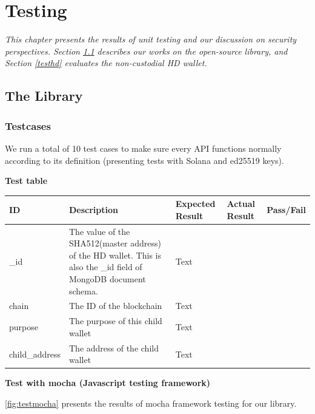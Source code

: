 \setlength{\abovedisplayskip}{0pt}
\setlength{\belowdisplayskip}{0pt}
\setlength{\abovedisplayshortskip}{0pt}
\setlength{\belowdisplayshortskip}{0pt}

\chapter{Testing}
\label{chap:testing}

\textit{This chapter presents the results of unit testing and our discussion on security perspectives. Section \ref{testlib} describes our works on the open-source library, and Section \ref{testhd} evaluates the non-custodial HD wallet.}

\minitoc

\section{The Library}
\label{testlib}
\subsection{Testcases}

We run a total of 10 test cases to make sure every API functions normally according to its definition (presenting tests with Solana and ed25519 keys). 

\bigskip
{\textbf{Test table}}
\bigskip

\begin{tabular}{| m{2cm} | m{6cm} | m{2cm} | m{2cm} | m{2cm} |}
    \hline
    ID & Description & Expected Result & Actual Result & Pass/Fail                                            \\ \hline
    \_id & The value of the SHA512(master address) of the HD wallet. This is also the \_id field of MongoDB document schema.  & Text   \\ \hline
    chain   & The ID of the blockchain & Text    \\ \hline
    purpose   & The purpose of this child wallet & Text    \\ \hline
    child\_address   & The address of the child wallet & Text    \\ \hline
\end{tabular}

\bigskip
{\textbf{Test with mocha (Javascript testing framework)}}

\bigskip
\autoref{fig:testmocha} presents the results of mocha framework testing for our library.
\bigskip

